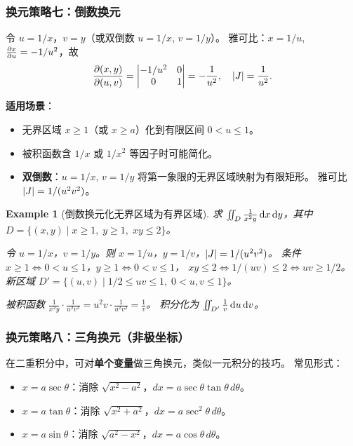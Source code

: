\documentclass{ctexart}
\newtheorem{example}[theorem]{Example}
\begin{document}
\subsubsection*{换元策略七：倒数换元}

令 $u = 1/x$，$v = y$（或双倒数 $u=1/x$, $v=1/y$）。
雅可比：$x = 1/u$, $\frac{\partial x}{\partial u} = -1/u^2$，故
\[
  \frac{\partial(x,y)}{\partial(u,v)} = \begin{vmatrix} -1/u^2 & 0 \\ 0 & 1 \end{vmatrix}
  = -\frac{1}{u^2}, \quad \left| J \right| = \frac{1}{u^2}.
\]

\textbf{适用场景}：
\begin{itemize}
  \item 无界区域 $x \ge 1$（或 $x \ge a$）化到有限区间 $0 < u \le 1$。
  \item 被积函数含 $1/x$ 或 $1/x^2$ 等因子时可能简化。
  \item \textbf{双倒数}：$u=1/x$, $v=1/y$ 将第一象限的无界区域映射为有限矩形。
    雅可比 $\left| J \right| = 1/(u^2v^2)$。
\end{itemize}

\begin{example}[倒数换元化无界区域为有界区域]
  求 $\iint_D \frac{1}{x^2 y}\,\mathrm{d} x\,\mathrm{d} y$，其中 $D = \{(x,y) \mid x \ge 1,\; y \ge 1,\; xy \le 2\}$。

  令 $u = 1/x$，$v = 1/y$。则 $x = 1/u$，$y = 1/v$，$\left| J \right| = 1/(u^2 v^2)$。
  条件 $x \ge 1 \Leftrightarrow 0 < u \le 1$，$y \ge 1 \Leftrightarrow 0 < v \le 1$，
  $xy \le 2 \Leftrightarrow 1/(uv) \le 2 \Leftrightarrow uv \ge 1/2$。
  新区域 $D' = \{(u,v) \mid 1/2 \le uv \le 1,\; 0 < u,v \le 1\}$。

  被积函数 $\frac{1}{x^2 y} \cdot \frac{1}{u^2 v^2}
  = u^2 v \cdot \frac{1}{u^2 v^2} = \frac{1}{v}$。
  积分化为 $\iint_{D'} \frac{1}{v}\,\mathrm{d} u\,\mathrm{d} v$。
\end{example}

\subsubsection*{换元策略八：三角换元（非极坐标）}

在二重积分中，可对\textbf{单个变量}做三角换元，类似一元积分的技巧。
常见形式：

\begin{itemize}
  \item $x = a\sec\theta$：消除 $\sqrt{x^2 - a^2}$，$dx = a\sec\theta\tan\theta\,d\theta$。
  \item $x = a\tan\theta$：消除 $\sqrt{x^2 + a^2}$，$dx = a\sec^2\theta\,d\theta$。
  \item $x = a\sin\theta$：消除 $\sqrt{a^2 - x^2}$，$dx = a\cos\theta\,d\theta$。
\end{itemize}
\end{document}
